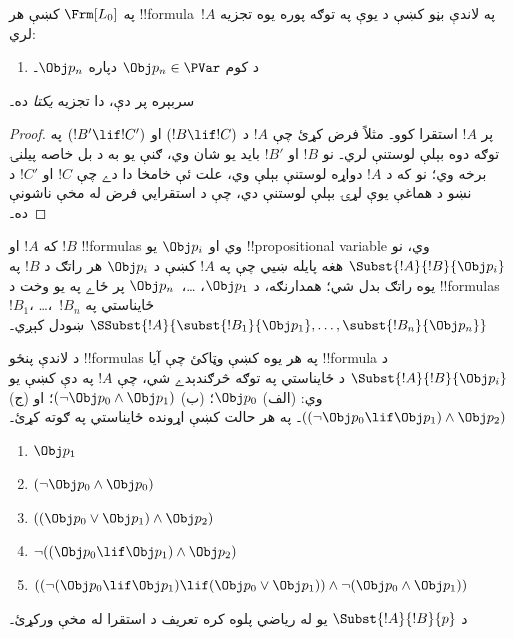 \documentclass[../../../include/open-logic-section]{subfiles}
\begin{document}
\begin{prop}
په $ \Frm[L_0]$ کښې هر !!{formula}~$!A$ په لاندې بڼو کښې د يوې په
توګه پوره يوه تجزيه لري:
\begin{enumerate}


\item د کوم $\Obj p_n \in  \PVar$ دپاره $\Obj p_n$۔
  




\end{enumerate}
سربېره پر دې، دا تجزيه \emph{يکتا} ده۔
\end{prop}

\begin{proof}
پر $!A$ استقرا کوو۔ مثلاً فرض کړئ چې $!A$ د $(!B \lif !C)$ او
$(!B' \lif !C')$ په توګه دوه بېلې لوستنې لري۔ نو $!B$ او $!B'$
بايد يو شان وي، ګنې يو به د بل خاصه پيلنۍ برخه وي؛ نو که د $!A$
دواړه لوستنې بېلې وي، علت ئې خامخا دا دے چې $!C$ او $!C'$ د نښو د
هماغې يوې لړۍ بېلې لوستنې دي، چې د استقرايي فرض له مخې ناشونې ده۔
\end{proof}


\begin{defn}
که $!A$ او $!B$ !!{formula}s وي او $\Obj p_i$ يو !!{propositional
variable} وي، نو $\Subst{!A}{!B}{\Obj p_i}$ هغه پايله ښيي چې په
$!A$ کښې د $\Obj p_i$ هر راتګ د $!B$ په يوه راتګ بدل شي؛ همدارنګه،
د $\Obj p_1$، \dots،~$\Obj p_n$ پر ځاے په يو وخت د !!{formula}s
$!B_1$، \dots،~$!B_n$ ځايناستي په
$\SSubst{!A}{\subst{!B_1}{\Obj p_1},\dots,\subst{!B_n}{\Obj p_n}}$
ښودل کېږي۔
\end{defn}

\begin{prob} د لاندې پنځو !!{formula}s په هر يوه کښې وټاکئ چې آيا
 !!{formula} د \( \Subst{!A}{!B}{\Obj p_i} \) د ځايناستي په توګه
 څرګندېدے شي، چې \( !A \) په دې کښې يو وي: (الف) \( \Obj p_0 \)؛
 (ب) \( ( \lnot \Obj p_0 \land \Obj p_1) \)؛ او (ج)
 \( ( ( \lnot \Obj p_0 \lif \Obj p_1 ) \land \Obj p_2 ) \)۔ په هر
 حالت کښې اړونده ځايناستي په ګوته کړئ۔
  \begin{enumerate}
    \item \( \Obj p_1 \) 
    \item \( ( \lnot \Obj p_0 \land \Obj p_0 ) \)
    \item \( ( ( \Obj p_0 \lor \Obj p_1 ) \land \Obj p_2 )  \)
    \item \( \lnot ( ( \Obj p_0 \lif \Obj p_1 ) \land \Obj p_2 ) \)
    \item \( (( \lnot ( \Obj p_0 \lif \Obj p_1 ) \lif ( \Obj p_0 \lor \Obj p_1 )) \land \lnot ( \Obj p_0 \land \Obj p_1 )) \)
  \end{enumerate}
\end{prob}

\begin{prob}
د $\Subst{!A}{!B}{p}$ يو له رياضي پلوه کره تعريف د استقرا له مخې
ورکړئ۔
\end{prob}
\end{document}
